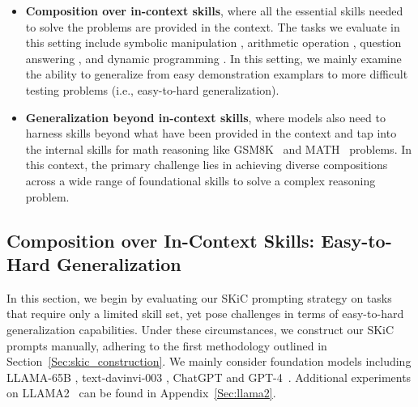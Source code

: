 \documentclass{article} \usepackage{arxiv}
\begin{document}
\begin{itemize}[leftmargin=0.6cm]
  \item \textbf{Composition over in-context skills}, where all the essential skills needed to solve the problems are provided in the context. The tasks we evaluate in this setting  include symbolic manipulation \citep{wei2022chain,zhou2022least,khot2022decomposed}, arithmetic operation \citep{dziri2023faith}, question answering \citep{khot2022decomposed}, and dynamic programming \citep{dziri2023faith}. In this setting, we mainly examine the ability to generalize from easy demonstration examplars to more difficult testing problems (i.e., easy-to-hard generalization).
  
  \item \textbf{Generalization beyond in-context skills}, where models also need to harness skills beyond what have been provided in the context and tap into the internal skills for math reasoning like GSM8K~\citep{wei2022chain,zhou2022least} and MATH~\citep{hendrycks2021measuring} problems. In this context, the primary challenge lies in achieving diverse compositions across a wide range of foundational skills to solve a complex reasoning problem.
\end{itemize}


\subsection{Composition over In-Context Skills: Easy-to-Hard Generalization}

In this section, we begin by evaluating our SKiC prompting strategy on tasks that require only a limited skill set, yet pose challenges in terms of easy-to-hard generalization capabilities. Under these circumstances, we construct our SKiC prompts manually, adhering to the first methodology outlined in Section~\ref{Sec:skic_construction}. We mainly consider foundation models including LLAMA-65B \citep{touvron2023llama1}, text-davinvi-003 \citep{brown2020language}, ChatGPT and GPT-4~\citep{openai2023gpt4}. Additional experiments on LLAMA2~\citep{touvron2023llama} can be found in Appendix~\ref{Sec:llama2}.
\end{document}
